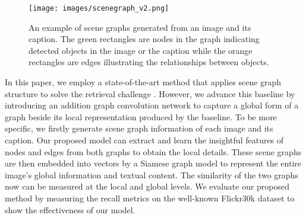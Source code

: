 \documentclass{IOS-Book-Article}
\begin{document}
\begin{figure}[ht!]
  \centering
  \texttt{[image: images/scenegraph\_v2.png]}
  \caption{An example of scene graphs generated from an image and its caption. The green rectangles are nodes in the graph indicating detected objects in the image or the caption while the orange rectangles are edges illustrating the relationships between objects. }
  \label{fig:scenegraph}
\end{figure}

In this paper, we employ a state-of-the-art method that applies scene graph structure to solve the retrieval challenge \cite{wang2020cross}. However, we advance this baseline by introducing an addition graph convolution network to capture a global form of a graph beside its local representation produced by the baseline. To be more specific, we firstly generate scene graph information of each image and its caption. Our proposed model can extract and learn the insightful features of nodes and edges from both graphs to obtain the local details. These scene graphs are then embedded into vectors by a Siamese graph model to represent the entire image's global information and textual content. The similarity of the two graphs now can be measured at the local and global levels. We evaluate our proposed method by measuring the recall metrics on the well-known Flickr30k \cite{flickr30k} dataset to show the effectiveness of our model.
\end{document}
